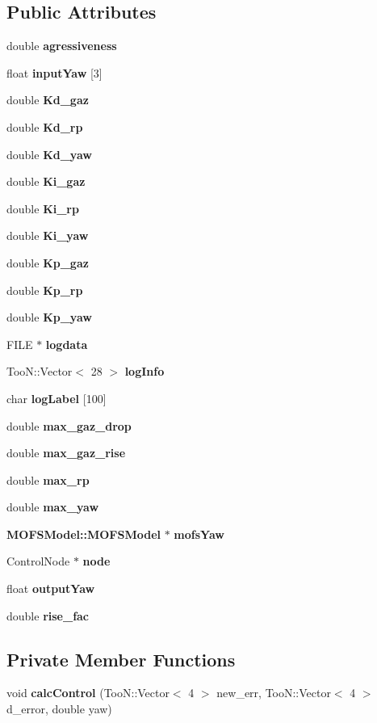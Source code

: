 \subsection*{Public Attributes}
\begin{DoxyCompactItemize}
\item 
double {\bf agressiveness}
\item 
float {\bf input\-Yaw} [3]
\item 
double {\bf Kd\-\_\-gaz}
\item 
double {\bf Kd\-\_\-rp}
\item 
double {\bf Kd\-\_\-yaw}
\item 
double {\bf Ki\-\_\-gaz}
\item 
double {\bf Ki\-\_\-rp}
\item 
double {\bf Ki\-\_\-yaw}
\item 
double {\bf Kp\-\_\-gaz}
\item 
double {\bf Kp\-\_\-rp}
\item 
double {\bf Kp\-\_\-yaw}
\item 
F\-I\-L\-E $\ast$ {\bf logdata}
\item 
Too\-N\-::\-Vector$<$ 28 $>$ {\bf log\-Info}
\item 
char {\bf log\-Label} [100]
\item 
double {\bf max\-\_\-gaz\-\_\-drop}
\item 
double {\bf max\-\_\-gaz\-\_\-rise}
\item 
double {\bf max\-\_\-rp}
\item 
double {\bf max\-\_\-yaw}
\item 
{\bf M\-O\-F\-S\-Model\-::\-M\-O\-F\-S\-Model} $\ast$ {\bf mofs\-Yaw}
\item 
Control\-Node $\ast$ {\bf node}
\item 
float {\bf output\-Yaw}
\item 
double {\bf rise\-\_\-fac}
\end{DoxyCompactItemize}
\subsection*{Private Member Functions}
\begin{DoxyCompactItemize}
\item 
void {\bf calc\-Control} (Too\-N\-::\-Vector$<$ 4 $>$ new\-\_\-err, Too\-N\-::\-Vector$<$ 4 $>$ d\-\_\-error, double yaw)
\end{DoxyCompactItemize}
